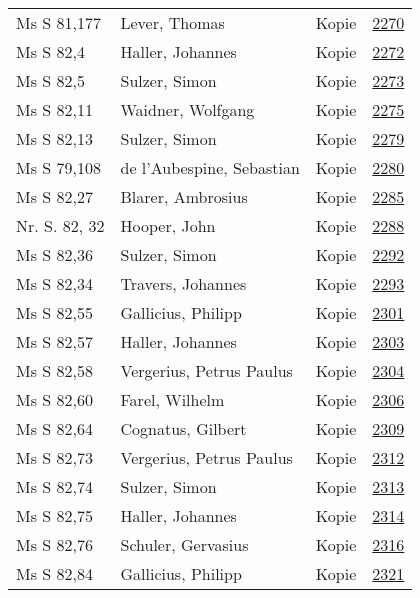 \documentclass[10pt,a4paper,landscape]{report}
\begin{document}
\begin{longtable}{p{16cm}p{4cm}lr}
Ms S 81,177	&	Lever, Thomas	&	Kopie	&	\href{http://130.60.24.72/assignment/2270}{2270}\\
Ms S 82,4	&	Haller, Johannes	&	Kopie	&	\href{http://130.60.24.72/assignment/2272}{2272}\\
Ms S 82,5	&	Sulzer, Simon	&	Kopie	&	\href{http://130.60.24.72/assignment/2273}{2273}\\
Ms S 82,11	&	Waidner, Wolfgang	&	Kopie	&	\href{http://130.60.24.72/assignment/2275}{2275}\\
Ms S 82,13	&	Sulzer, Simon	&	Kopie	&	\href{http://130.60.24.72/assignment/2279}{2279}\\
Ms S 79,108	&	de l'Aubespine, Sebastian	&	Kopie	&	\href{http://130.60.24.72/assignment/2280}{2280}\\
Ms S 82,27	&	Blarer, Ambrosius	&	Kopie	&	\href{http://130.60.24.72/assignment/2285}{2285}\\
Nr. S. 82, 32	&	Hooper, John	&	Kopie	&	\href{http://130.60.24.72/assignment/2288}{2288}\\
Ms S 82,36	&	Sulzer, Simon	&	Kopie	&	\href{http://130.60.24.72/assignment/2292}{2292}\\
Ms S 82,34	&	Travers, Johannes	&	Kopie	&	\href{http://130.60.24.72/assignment/2293}{2293}\\
Ms S 82,55	&	Gallicius, Philipp	&	Kopie	&	\href{http://130.60.24.72/assignment/2301}{2301}\\
Ms S 82,57	&	Haller, Johannes	&	Kopie	&	\href{http://130.60.24.72/assignment/2303}{2303}\\
Ms S 82,58	&	Vergerius, Petrus Paulus	&	Kopie	&	\href{http://130.60.24.72/assignment/2304}{2304}\\
Ms S 82,60	&	Farel, Wilhelm	&	Kopie	&	\href{http://130.60.24.72/assignment/2306}{2306}\\
Ms S 82,64	&	Cognatus, Gilbert	&	Kopie	&	\href{http://130.60.24.72/assignment/2309}{2309}\\
Ms S 82,73	&	Vergerius, Petrus Paulus	&	Kopie	&	\href{http://130.60.24.72/assignment/2312}{2312}\\
Ms S 82,74	&	Sulzer, Simon	&	Kopie	&	\href{http://130.60.24.72/assignment/2313}{2313}\\
Ms S 82,75	&	Haller, Johannes	&	Kopie	&	\href{http://130.60.24.72/assignment/2314}{2314}\\
Ms S 82,76	&	Schuler, Gervasius	&	Kopie	&	\href{http://130.60.24.72/assignment/2316}{2316}\\
Ms S 82,84	&	Gallicius, Philipp	&	Kopie	&	\href{http://130.60.24.72/assignment/2321}{2321}\\

\end{longtable}
\end{document}
